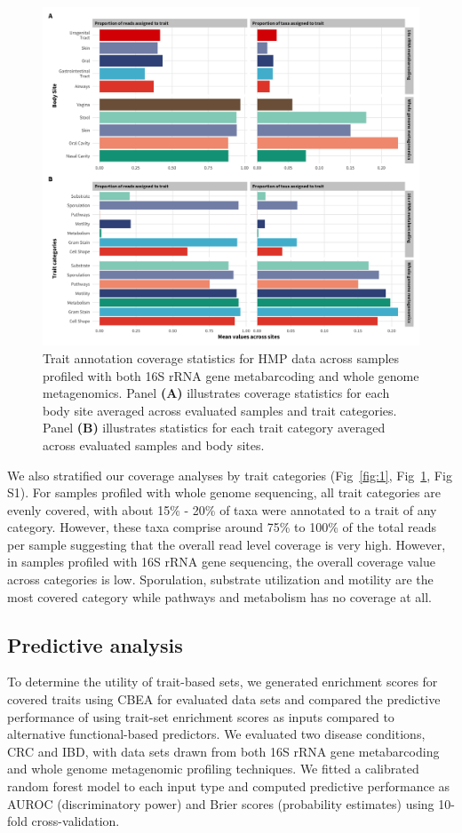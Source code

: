 \documentclass[10pt,letterpaper]{article}
\begin{document}
\begin{figure}[!h]
\includegraphics[width=0.99\linewidth]{figures/coverage_by_joint_agg.png}
\caption{Trait annotation coverage statistics for HMP data across samples profiled with both 16S rRNA gene metabarcoding and whole genome metagenomics. Panel \textbf{(A)} illustrates coverage statistics for each body site averaged across evaluated samples and trait categories. Panel \textbf{(B)} illustrates statistics for each trait category averaged across evaluated samples and body sites.}
\label{fig:2}
\end{figure}

We also stratified our coverage analyses by trait categories (Fig~\ref{fig:1}, Fig~\ref{fig:2}, Fig S1). For samples profiled with whole genome sequencing, all trait categories are evenly covered, with about 15\% - 20\% of taxa were annotated to a trait of any category. However, these taxa comprise around 75\% to 100\% of the total reads per sample suggesting that the overall read level coverage is very high. However, in samples profiled with 16S rRNA gene sequencing, the overall coverage value across categories is low. Sporulation, substrate utilization and motility are the most covered category while pathways and metabolism has no coverage at all.  

\subsection*{Predictive analysis} 
To determine the utility of trait-based sets, we generated enrichment scores for covered traits using CBEA \cite{nguyen2021cbea} for evaluated data sets and compared the predictive performance of using trait-set enrichment scores as inputs compared to alternative functional-based predictors. We evaluated two disease conditions, CRC and IBD, with data sets drawn from both 16S rRNA gene metabarcoding and whole genome metagenomic profiling techniques. We fitted a calibrated random forest model to each input type and computed predictive performance as AUROC (discriminatory power) and Brier scores (probability estimates) using 10-fold cross-validation.  
\end{document}
